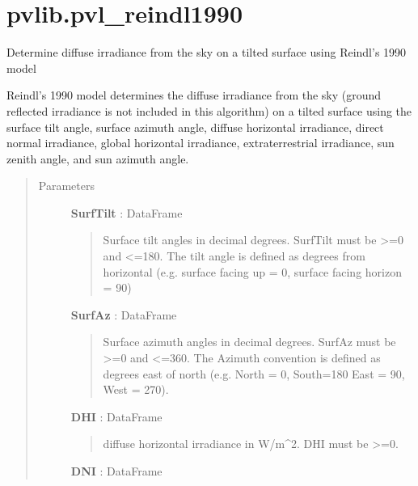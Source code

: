 \documentclass[letterpaper,10pt,english]{sphinxmanual}
\begin{document}
\section{pvlib.pvl\_reindl1990}
\label{stubs/pvlib.pvl_reindl1990:pvlib-pvl-reindl1990}\label{stubs/pvlib.pvl_reindl1990::doc}

\begin{fulllineitems}
\label{stubs/pvlib.pvl_reindl1990:pvlib.pvl_reindl1990}
Determine diffuse irradiance from the sky on a tilted surface using Reindl's 1990 model

Reindl's 1990 model determines the diffuse irradiance from the sky
(ground reflected irradiance is not included in this algorithm) on a
tilted surface using the surface tilt angle, surface azimuth angle,
diffuse horizontal irradiance, direct normal irradiance, global
horizontal irradiance, extraterrestrial irradiance, sun zenith angle,
and sun azimuth angle.
\begin{quote}\begin{description}
\item[{Parameters}] \leavevmode
\textbf{SurfTilt} : DataFrame
\begin{quote}

Surface tilt angles in decimal degrees.
SurfTilt must be \textgreater{}=0 and \textless{}=180. The tilt angle is defined as
degrees from horizontal (e.g. surface facing up = 0, surface facing
horizon = 90)
\end{quote}

\textbf{SurfAz} : DataFrame
\begin{quote}

Surface azimuth angles in decimal degrees.
SurfAz must be \textgreater{}=0 and \textless{}=360. The Azimuth convention is defined
as degrees east of north (e.g. North = 0, South=180 East = 90, West = 270).
\end{quote}

\textbf{DHI} : DataFrame
\begin{quote}

diffuse horizontal irradiance in W/m\textasciicircum{}2. 
DHI must be \textgreater{}=0.
\end{quote}

\textbf{DNI} : DataFrame
\begin{quote}


\end{quote}
\end{description}
\end{quote}
\end{fulllineitems}
\end{document}
